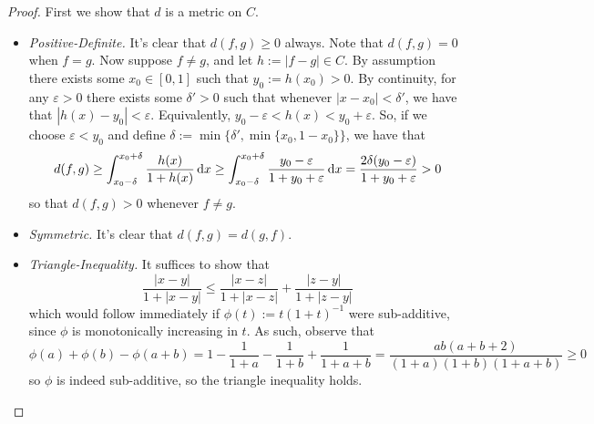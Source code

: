 \begin{proof}
    First we show that \(d\) is a metric on \(C\). 
    \begin{itemize}
        \itemsep0em
        \item \emph{Positive-Definite.} It's clear that \(d(f, g) \geq 0\) always. Note that \(d(f,g) = 0\) when \(f = g\). Now suppose \(f \neq g\), and let \(h := |f - g| \in C\). By assumption there exists some \(x_0 \in [0,1]\) such that \(y_0 := h(x_0) > 0\). By continuity, for any \(\varepsilon > 0\) there exists some \(\delta' > 0\) such that whenever \(|x - x_0| < \delta'\), we have that \(|h(x) - y_0| < \varepsilon\). Equivalently, \(y_0 - \varepsilon < h(x) < y_0 + \varepsilon\). So, if we choose \(\varepsilon < y_0\) and define \(\delta := \min\{\delta', \min\{x_0, 1 - x_0\}\}\), we have that 
        \[
            d(f, g)
            \geq \int_{x_0 - \delta}^{x_0 + \delta} \frac{h(x)}{1 + h(x)} \, \mathrm{d}x 
            \geq \int_{x_0 - \delta}^{x_0 + \delta} \frac{y_0 - \varepsilon}{1 + y_0 + \varepsilon} \, \mathrm{d}x
            = \frac{2\delta (y_0 - \varepsilon)}{1 + y_0 + \varepsilon}
            > 0
        \]
        so that \(d(f, g) > 0\) whenever \(f \neq g\). 
        \item \emph{Symmetric.} It's clear that \(d(f, g) = d(g, f)\). 
        \item \emph{Triangle-Inequality.} It suffices to show that 
        \[
            \frac{|x - y|}{1 + |x - y|} \leq \frac{|x - z|}{1 + |x - z|} + \frac{|z - y|}{1 + |z - y|}
        \]
        which would follow immediately if \(\phi(t) := t(1+t)^{-1}\) were sub-additive, since \(\phi\) is monotonically increasing in \(t\). As such, observe that
        \[
            \phi(a) + \phi(b) - \phi(a + b)
            = 1 - \frac{1}{1+a} - \frac{1}{1+b} + \frac{1}{1+a+b}
            = \frac{ab(a+b+2)}{(1+a)(1+b)(1+a+b)}
            \geq 0
        \]
        so \(\phi\) is indeed sub-additive, so the triangle inequality holds. 
    \end{itemize}


\end{proof}
